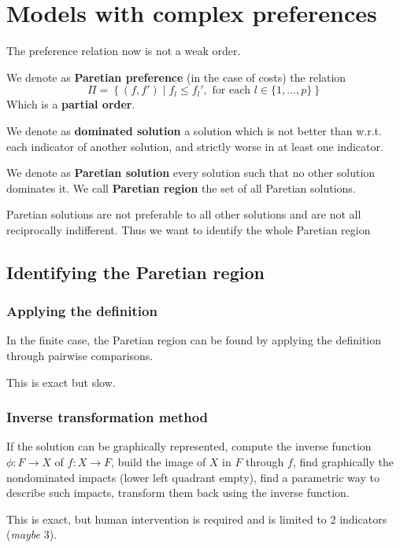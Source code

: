 \section{Models with complex preferences}

The preference relation now is not a weak order. 

We denote as \textbf{Paretian preference} (in the case of costs) the relation 
$$ \Pi = \left\{(f, f') \mid f_l \leq f_l', \text{ for each } l \in \{1, \dots, p\}\right\} $$
Which is a \textbf{partial order}.

We denote as \textbf{dominated solution} a solution which is not better than w.r.t. each indicator of another solution, and strictly worse in at least one indicator.

We denote as \textbf{Paretian solution} every solution such that no other solution dominates it. We call \textbf{Paretian region} the set of all Paretian solutions.

Paretian solutions are not preferable to all other solutions and are not all reciprocally indifferent. Thus we want to identify the whole Paretian region

\subsection{Identifying the Paretian region}

\subsubsection{Applying the definition}

In the finite case, the Paretian region can be found by applying the definition through pairwise comparisons. 

This is exact but slow.

\subsubsection{Inverse transformation method}

If the solution can be graphically represented, compute the inverse function $\phi: F \rightarrow X$ of $f: X \rightarrow F$, build the image of $X$ in $F$ through $f$, find graphically the nondominated impacts (lower left quadrant empty), find a parametric way to describe such impacts, transform them back using the inverse function. 

This is exact, but human intervention is required and is limited to 2 indicators (\textit{maybe} 3).

